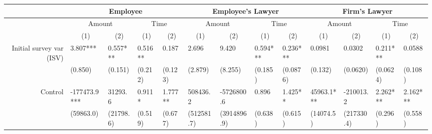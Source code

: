 \begin{tabular}{rrrrrrrrrrrrr}
\toprule
      & \multicolumn{4}{c}{Employee}  & \multicolumn{4}{c}{Employee's Lawyer} & \multicolumn{4}{c}{Firm's Lawyer} \\
\midrule
      & \multicolumn{2}{c}{Amount} & \multicolumn{2}{c}{Time} & \multicolumn{2}{c}{Amount} & \multicolumn{2}{c}{Time} & \multicolumn{2}{c}{Amount} & \multicolumn{2}{c}{Time} \\
      & \multicolumn{1}{c}{(1)} & \multicolumn{1}{c}{(2)} & \multicolumn{1}{c}{(1)} & \multicolumn{1}{c}{(2)} & \multicolumn{1}{c}{(1)} & \multicolumn{1}{c}{(2)} & \multicolumn{1}{c}{(1)} & \multicolumn{1}{c}{(2)} & \multicolumn{1}{c}{(1)} & \multicolumn{1}{c}{(2)} & \multicolumn{1}{c}{(1)} & \multicolumn{1}{c}{(2)} \\
      \midrule
      \midrule
Initial survey var (ISV) & \multicolumn{1}{l}{3.807***} & \multicolumn{1}{l}{0.557***} & \multicolumn{1}{l}{0.516**} & \multicolumn{1}{l}{0.187} & \multicolumn{1}{l}{2.696} & \multicolumn{1}{l}{9.420} & \multicolumn{1}{l}{0.594***} & \multicolumn{1}{l}{0.236***} & \multicolumn{1}{l}{0.0981} & \multicolumn{1}{l}{0.0302} & \multicolumn{1}{l}{0.211***} & \multicolumn{1}{l}{0.0588} \\
      & \multicolumn{1}{l}{(0.850)} & \multicolumn{1}{l}{(0.151)} & \multicolumn{1}{l}{(0.212)} & \multicolumn{1}{l}{(0.123)} & \multicolumn{1}{l}{(2.879)} & \multicolumn{1}{l}{(8.255)} & \multicolumn{1}{l}{(0.185)} & \multicolumn{1}{l}{(0.0876)} & \multicolumn{1}{l}{(0.132)} & \multicolumn{1}{l}{(0.0620)} & \multicolumn{1}{l}{(0.0624)} & \multicolumn{1}{l}{(0.108)} \\
Control & \multicolumn{1}{l}{-177473.9***} & \multicolumn{1}{l}{31293.6} & \multicolumn{1}{l}{0.911*} & \multicolumn{1}{l}{1.777**} & \multicolumn{1}{l}{508436.2} & \multicolumn{1}{l}{-5726800.6} & \multicolumn{1}{l}{0.896} & \multicolumn{1}{l}{1.425**} & \multicolumn{1}{l}{45963.1***} & \multicolumn{1}{l}{-210013.2} & \multicolumn{1}{l}{2.262***} & \multicolumn{1}{l}{2.162***} \\
      & \multicolumn{1}{l}{(59863.0)} & \multicolumn{1}{l}{(21798.6)} & \multicolumn{1}{l}{(0.519)} & \multicolumn{1}{l}{(0.677)} & \multicolumn{1}{l}{(512581.7)} & \multicolumn{1}{l}{(3914896.9)} & \multicolumn{1}{l}{(0.638)} & \multicolumn{1}{l}{(0.615)} & \multicolumn{1}{l}{(14074.5)} & \multicolumn{1}{l}{(217330.4)} & \multicolumn{1}{l}{(0.296)} & \multicolumn{1}{l}{(0.558)} \\

\end{tabular}
